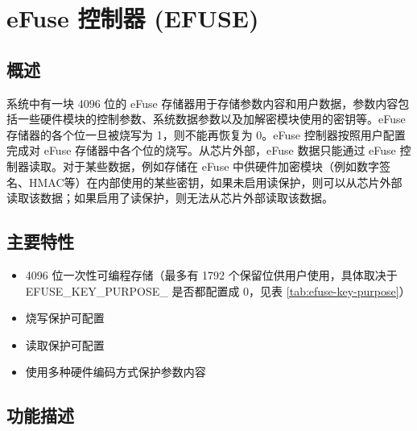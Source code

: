 \documentclass[main\_\_CN.tex]{subfiles}
\begin{document}

\ifglobal
\else
    \listoftodos
    {\let\clearpage\relax \listofdonetodos}
    \tableofcontents
\fi




\chapter{eFuse 控制器 (EFUSE)}
\label{mod:efuse}
\hypertarget{efuse}{}




\section{概述}
\chipname{} 系统中有一块 4096 位的 eFuse 存储器用于存储参数内容和用户数据，参数内容包括一些硬件模块的控制参数、系统数据参数以及加解密模块使用的密钥等。eFuse 存储器的各个位一旦被烧写为 1，则不能再恢复为 0。eFuse 控制器按照用户配置完成对 eFuse 存储器中各个位的烧写。从芯片外部，eFuse 数据只能通过 eFuse 控制器读取。对于某些数据，例如存储在 eFuse 中供硬件加密模块（例如数字签名、HMAC等）在内部使用的某些密钥，如果未启用读保护，则可以从芯片外部读取该数据；如果启用了读保护，则无法从芯片外部读取该数据。


\section{主要特性}

\begin{itemize}
    \item 4096 位一次性可编程存储（最多有 1792 个保留位供用户使用，具体取决于EFUSE\_KEY\_PURPOSE\_ 是否都配置成 0，见表 \ref{tab:efuse-key-purpose}）
    \item 烧写保护可配置
    \item 读取保护可配置
    \item 使用多种硬件编码方式保护参数内容
\end{itemize}


\section{功能描述}
\end{document}
